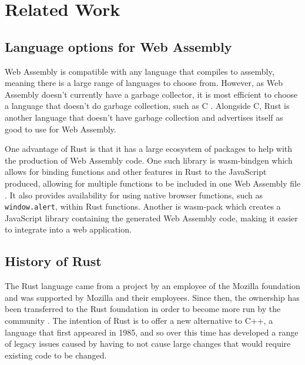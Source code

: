 \documentclass[12pt,a4paper]{article}
\begin{document}
\section{Related Work}

\subsection{Language options for Web Assembly}

Web Assembly is compatible with any language that compiles to assembly, meaning there is a large range of languages to choose from. However, as Web Assembly doesn't currently have a garbage collector, it is most efficient to choose a language that doesn't do garbage collection, such as C \cite{haas2017bringing}. Alongside C, Rust is another language that doesn't have garbage collection and advertises itself as good to use for Web Assembly.

One advantage of Rust is that it has a large ecosystem of packages to help with the production of Web Assembly code. One such library is wasm-bindgen which allows for binding functions and other features in Rust to the JavaScript produced, allowing for multiple functions to be included in one Web Assembly file \cite{wasmbindgen}. It also provides availability for using native browser functions, such as \texttt{window.alert}, within Rust functions. Another is wasm-pack which creates a JavaScript library containing the generated Web Assembly code, making it easier to integrate into a web application.


\subsection{History of Rust}


The Rust language came from a project by an employee of the Mozilla foundation and was supported by Mozilla and their employees. Since then, the ownership has been transferred to the Rust foundation in order to become more run by the community \cite{rustfoundation}. The intention of Rust is to offer a new alternative to C++, a language that first appeared in 1985, and so over this time has developed a range of legacy issues caused by having to not cause large changes that would require existing code to be changed.
\end{document}
